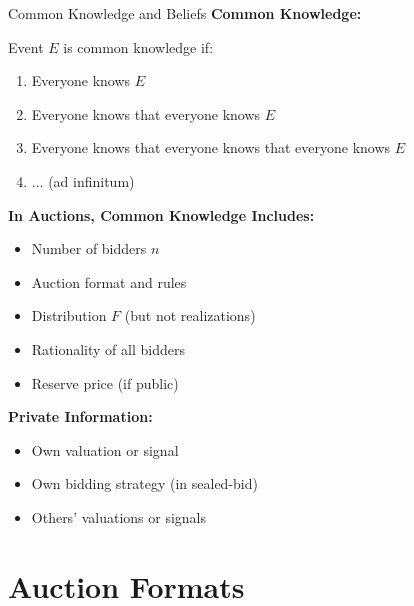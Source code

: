 \documentclass[xcolor={x11names}]{beamer}
\begin{document}
\begin{frame}{Common Knowledge and Beliefs}
\textbf{Common Knowledge:}

Event $E$ is common knowledge if:
\begin{enumerate}
  \item Everyone knows $E$
  \item Everyone knows that everyone knows $E$
  \item Everyone knows that everyone knows that everyone knows $E$
  \item ... (ad infinitum)
\end{enumerate}


\textbf{In Auctions, Common Knowledge Includes:}
\begin{itemize}
  \item Number of bidders $n$
  \item Auction format and rules
  \item Distribution $F$ (but not realizations)
  \item Rationality of all bidders
  \item Reserve price (if public)
\end{itemize}


\textbf{Private Information:}
\begin{itemize}
  \item Own valuation or signal
  \item Own bidding strategy (in sealed-bid)
  \item Others' valuations or signals
\end{itemize}
\end{frame}

\section{Auction Formats}
\end{document}
